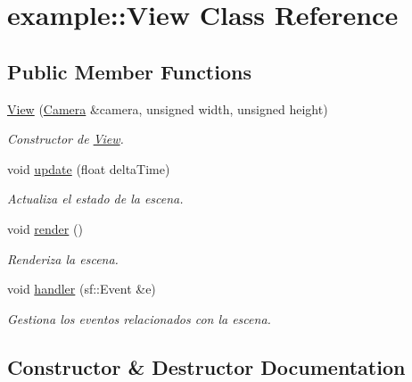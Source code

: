 \hypertarget{classexample_1_1_view}{}\section{example\+::View Class Reference}
\label{classexample_1_1_view}
\subsection*{Public Member Functions}
\begin{DoxyCompactItemize}
\item 
\mbox{\hyperlink{classexample_1_1_view_a213048a283f635f313f2507ce64ee591}{View}} (\mbox{\hyperlink{classexample_1_1_camera}{Camera}} \&camera, unsigned width, unsigned height)
\begin{DoxyCompactList}\small\item\em Constructor de \mbox{\hyperlink{classexample_1_1_view}{View}}. \end{DoxyCompactList}\item 
void \mbox{\hyperlink{classexample_1_1_view_ace94cb5c7410536cf87488bbb3be1ec6}{update}} (float delta\+Time)
\begin{DoxyCompactList}\small\item\em Actualiza el estado de la escena. \end{DoxyCompactList}\item 
void \mbox{\hyperlink{classexample_1_1_view_a10ea89fc705a2ba2252f673499524bf2}{render}} ()
\begin{DoxyCompactList}\small\item\em Renderiza la escena. \end{DoxyCompactList}\item 
void \mbox{\hyperlink{classexample_1_1_view_a1452ff9d5e9d5bca4681ee17dcab83c1}{handler}} (sf\+::\+Event \&e)
\begin{DoxyCompactList}\small\item\em Gestiona los eventos relacionados con la escena. \end{DoxyCompactList}\end{DoxyCompactItemize}


\subsection{Constructor \& Destructor Documentation}
\mbox{\label{classexample_1_1_view_a213048a283f635f313f2507ce64ee591}} 
